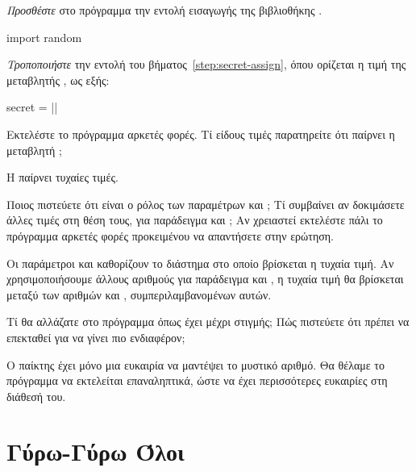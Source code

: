 \documentclass[a4paper,11pt,oneside]{book}
\begin{document}
\begin{step}
\label{step:secret-random}
\emph{Προσθέστε} στο πρόγραμμα την εντολή εισαγωγής της βιβλιοθήκης .

\begin{pynew}
import random
\end{pynew}

\emph{Τροποποιήστε} την εντολή του βήματος~\ref{step:secret-assign}, όπου ορίζεται η τιμή της μεταβλητής , ως εξής:

\begin{pyplain}
secret = ||
\end{pyplain}

Εκτελέστε το πρόγραμμα αρκετές φορές. Τί είδους τιμές παρατηρείτε ότι παίρνει η μεταβλητή ;

\begin{answer}
	Η  παίρνει τυχαίες τιμές.
\end{answer}

Ποιος πιστεύετε ότι είναι ο ρόλος των παραμέτρων  και ; Τί συμβαίνει αν δοκιμάσετε άλλες τιμές στη θέση τους, για παράδειγμα  και ; Αν χρειαστεί εκτελέστε πάλι το πρόγραμμα αρκετές φορές προκειμένου να απαντήσετε στην ερώτηση.

\begin{answer}
	Οι παράμετροι  και  καθορίζουν το διάστημα στο οποίο βρίσκεται η τυχαία τιμή. Αν χρησιμοποιήσουμε άλλους αριθμούς για παράδειγμα  και , η τυχαία τιμή θα βρίσκεται μεταξύ των αριθμών  και , συμπεριλαμβανομένων αυτών.
\end{answer}
\end{step}

\begin{step}
Τί θα αλλάζατε στο πρόγραμμα όπως έχει μέχρι στιγμής; Πώς πιστεύετε ότι πρέπει να επεκταθεί για να γίνει πιο ενδιαφέρον;

\begin{answer}
	Ο παίκτης έχει μόνο μια ευκαιρία να μαντέψει το μυστικό αριθμό. Θα θέλαμε το πρόγραμμα να εκτελείται επαναληπτικά, ώστε να έχει περισσότερες ευκαιρίες στη διάθεσή του.
\end{answer}
\end{step}

\section{Γύρω-Γύρω Όλοι}
\end{document}
